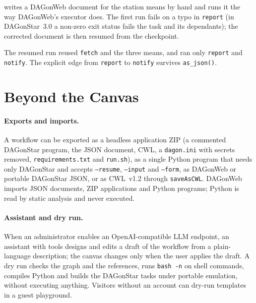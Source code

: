  writes a DAGonWeb document for the station means
by hand and runs it the way DAGonWeb's executor does. The first run fails on a
typo in \texttt{report} (in DAGonStar~3.0 a non-zero exit status fails the task
and its dependants); the corrected document is then resumed from the
checkpoint.





The resumed run reused \texttt{fetch} and the three means, and ran only
\texttt{report} and \texttt{notify}. The explicit edge from \texttt{report} to
\texttt{notify} survives \texttt{as\_json()}.

\section{Beyond the Canvas}

\paragraph{Exports and imports.} A workflow can be exported as a headless
application ZIP (a commented DAGonStar program, the JSON document, CWL, a
\texttt{dagon.ini} with secrets removed, \texttt{requirements.txt} and
\texttt{run.sh}), as a single Python program that needs only DAGonStar and
accepts \texttt{--resume}, \texttt{--input} and \texttt{--form}, as DAGonWeb or
portable DAGonStar JSON, or as CWL~v1.2 through \texttt{saveAsCWL}. DAGonWeb
imports JSON documents, ZIP applications and Python programs; Python is read by
static analysis and never executed.

\paragraph{Assistant and dry run.} When an administrator enables an
OpenAI-compatible LLM endpoint, an assistant with tools designs and edits a
draft of the workflow from a plain-language description; the canvas changes
only when the user applies the draft. A dry run checks the graph and the
references, runs \texttt{bash -n} on shell commands, compiles Python and builds
the DAGonStar tasks under portable emulation, without executing anything.
Visitors without an account can dry-run templates in a guest playground.

